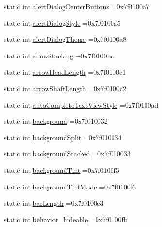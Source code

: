 \begin{DoxyCompactItemize}
static int \hyperlink{classandroid_1_1support_1_1v7_1_1appcompat_1_1R_1_1attr_a660258c26951fc3dae1b71e792e182ce}{alert\+Dialog\+Center\+Buttons} =0x7f0100a7
\item 
static int \hyperlink{classandroid_1_1support_1_1v7_1_1appcompat_1_1R_1_1attr_a042bf450c17c2f3a1a989383edb17c70}{alert\+Dialog\+Style} =0x7f0100a5
\item 
static int \hyperlink{classandroid_1_1support_1_1v7_1_1appcompat_1_1R_1_1attr_a598b5c765c91688704f66e15a7a0a7f6}{alert\+Dialog\+Theme} =0x7f0100a8
\item 
static int \hyperlink{classandroid_1_1support_1_1v7_1_1appcompat_1_1R_1_1attr_ac79789d7ec66b59b872a66a3729ba8c0}{allow\+Stacking} =0x7f0100ba
\item 
static int \hyperlink{classandroid_1_1support_1_1v7_1_1appcompat_1_1R_1_1attr_aeb28b87d979ed4affb228d5f5e913393}{arrow\+Head\+Length} =0x7f0100c1
\item 
static int \hyperlink{classandroid_1_1support_1_1v7_1_1appcompat_1_1R_1_1attr_a067b24dda9f091a098650a5006514996}{arrow\+Shaft\+Length} =0x7f0100c2
\item 
static int \hyperlink{classandroid_1_1support_1_1v7_1_1appcompat_1_1R_1_1attr_a9c6adb855e4bb0ec184b8f3c903ac322}{auto\+Complete\+Text\+View\+Style} =0x7f0100ad
\item 
static int \hyperlink{classandroid_1_1support_1_1v7_1_1appcompat_1_1R_1_1attr_a9b1855dc381ac6067c08e52a28f5c096}{background} =0x7f010032
\item 
static int \hyperlink{classandroid_1_1support_1_1v7_1_1appcompat_1_1R_1_1attr_a39a8f294508e3340e83275f406757bfc}{background\+Split} =0x7f010034
\item 
static int \hyperlink{classandroid_1_1support_1_1v7_1_1appcompat_1_1R_1_1attr_a917a60116d782ec096fb8ca79630cb1e}{background\+Stacked} =0x7f010033
\item 
static int \hyperlink{classandroid_1_1support_1_1v7_1_1appcompat_1_1R_1_1attr_a6bf6c479f7c0fccd735ef4b8cd293ceb}{background\+Tint} =0x7f0100f5
\item 
static int \hyperlink{classandroid_1_1support_1_1v7_1_1appcompat_1_1R_1_1attr_a11663679360aa87a90983ccadc18c5ee}{background\+Tint\+Mode} =0x7f0100f6
\item 
static int \hyperlink{classandroid_1_1support_1_1v7_1_1appcompat_1_1R_1_1attr_a7b7ce7358f8999f6e3d75b7456383a9c}{bar\+Length} =0x7f0100c3
\item 
static int \hyperlink{classandroid_1_1support_1_1v7_1_1appcompat_1_1R_1_1attr_a87f1263041e8659e9a13195dc36cca7f}{behavior\+\_\+hideable} =0x7f0100fb

\end{DoxyCompactItemize}

